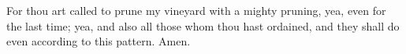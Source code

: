		For thou art called to prune my vineyard with a mighty pruning, yea, even for the last time; yea, and also all those whom thou hast ordained, and they shall do even according to this pattern. Amen.


